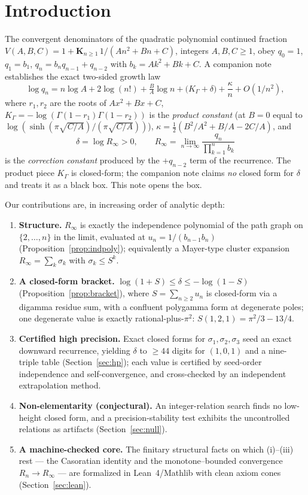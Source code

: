 \documentclass[11pt]{article}
\newcommand{\Rinf}{R_\infty}
\begin{document}
\section{Introduction}

The convergent denominators of the quadratic polynomial continued fraction
$V(A,B,C)=1+\mathbf{K}_{n\ge1}\,1/(An^2+Bn+C)$, integers $A,B,C\ge1$, obey
$q_0=1$, $q_1=b_1$, $q_n=b_nq_{n-1}+q_{n-2}$ with $b_k=Ak^2+Bk+C$. A companion
note~\cite{growth} establishes the exact two-sided growth law
\begin{equation}\label{eq:law}
  \log q_n=n\log A+2\log(n!)+\tfrac{B}{A}\log n+\big(K_\Gamma+\delta\big)
           +\frac{\kappa}{n}+O(1/n^2),
\end{equation}
where $r_1,r_2$ are the roots of $Ax^2+Bx+C$,
$K_\Gamma=-\log(\Gamma(1-r_1)\Gamma(1-r_2))$ is the \emph{product constant} (at
$B=0$ equal to $\log(\sinh(\pi\sqrt{C/A})/(\pi\sqrt{C/A}))$),
$\kappa=\tfrac12(B^2/A^2+B/A-2C/A)$, and
\begin{equation}\label{eq:delta}
  \delta=\log\Rinf>0,\qquad \Rinf=\lim_{n\to\infty}\frac{q_n}{\prod_{k=1}^n b_k}
\end{equation}
is the \emph{correction constant} produced by the $+q_{n-2}$ term of the recurrence.
The product piece $K_\Gamma$ is closed-form; the companion note claims \emph{no}
closed form for $\delta$ and treats it as a black box. This note opens the box.

Our contributions are, in increasing order of analytic depth:
\begin{enumerate}
\item[(i)] \textbf{Structure.} $\Rinf$ is exactly the independence polynomial of
the path graph on $\{2,\dots,n\}$ in the limit, evaluated at $u_n=1/(b_{n-1}b_n)$
(Proposition~\ref{prop:indpoly}); equivalently a Mayer-type cluster expansion
$\Rinf=\sum_k\sigma_k$ with $\sigma_k\le S^k$.
\item[(ii)] \textbf{A closed-form bracket.} $\log(1+S)\le\delta\le-\log(1-S)$
(Proposition~\ref{prop:bracket}), where $S=\sum_{n\ge2}u_n$ is closed-form via a
digamma residue sum, with a confluent polygamma form at degenerate poles; one
degenerate value is exactly rational-plus-$\pi^2$: $S(1,2,1)=\pi^2/3-13/4$.
\item[(iii)] \textbf{Certified high precision.} Exact closed forms for
$\sigma_1,\sigma_2,\sigma_3$ seed an exact downward recurrence, yielding $\delta$ to
$\ge44$ digits for $(1,0,1)$ and a nine-triple table (Section~\ref{sec:hp}); each
value is certified by seed-order independence and self-convergence, and
cross-checked by an independent extrapolation method.
\item[(iv)] \textbf{Non-elementarity (conjectural).} An integer-relation search
finds no low-height closed form, and a precision-stability test exhibits the
uncontrolled relations as artifacts (Section~\ref{sec:null}).
\item[(v)] \textbf{A machine-checked core.} The finitary structural facts on which
(i)--(iii) rest --- the Casoratian identity and the monotone--bounded convergence
$R_n\to\Rinf$ --- are formalized in Lean~4/Mathlib with clean axiom cones
(Section~\ref{sec:lean}).
\end{enumerate}
\end{document}
